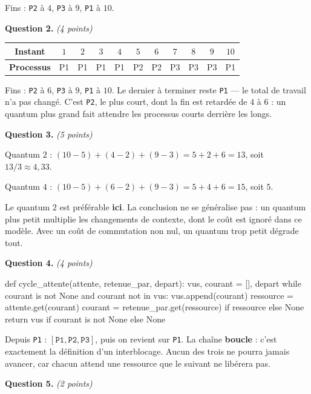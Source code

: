 Fins : \texttt{P2} à $4$, \texttt{P3} à $9$, \texttt{P1} à $10$.

\medskip
\textbf{Question 2.} \emph{(4 points)}

\begin{center}
\begin{tabular}{|c|c|c|c|c|c|c|c|c|c|c|}
\hline
\textbf{Instant} & $1$ & $2$ & $3$ & $4$ & $5$ & $6$ & $7$ & $8$ & $9$ & $10$ \\
\hline
\textbf{Processus} & P1 & P1 & P1 & P1 & P2 & P2 & P3 & P3 & P3 & P1 \\
\hline
\end{tabular}
\end{center}

Fins : \texttt{P2} à $6$, \texttt{P3} à $9$, \texttt{P1} à $10$. Le dernier à
terminer reste \texttt{P1} — le total de travail n'a pas changé. C'est
\texttt{P2}, le plus court, dont la fin est retardée de $4$ à $6$ : un quantum
plus grand fait attendre les processus courts derrière les longs.

\medskip
\textbf{Question 3.} \emph{(5 points)}

Quantum $2$ : $(10-5) + (4-2) + (9-3) = 5 + 2 + 6 = 13$, soit
$13/3 \approx 4{,}33$.

Quantum $4$ : $(10-5) + (6-2) + (9-3) = 5 + 4 + 6 = 15$, soit $5$.

Le quantum $2$ est préférable \textbf{ici}. La conclusion ne se généralise pas :
un quantum plus petit multiplie les changements de contexte, dont le coût est
ignoré dans ce modèle. Avec un coût de commutation non nul, un quantum trop
petit dégrade tout.

\medskip
\textbf{Question 4.} \emph{(4 points)}

\begin{python}
def cycle_attente(attente, retenue_par, depart):
    vus, courant = [], depart
    while courant is not None and courant not in vus:
        vus.append(courant)
        ressource = attente.get(courant)
        courant = retenue_par.get(ressource) if ressource else None
    return vus if courant is not None else None
\end{python}

Depuis \texttt{P1} : $[\texttt{P1}, \texttt{P2}, \texttt{P3}]$, puis on revient
sur \texttt{P1}. La chaîne \textbf{boucle} : c'est exactement la définition d'un
interblocage. Aucun des trois ne pourra jamais avancer, car chacun attend une
ressource que le suivant ne libérera pas.

\medskip
\textbf{Question 5.} \emph{(2 points)}

